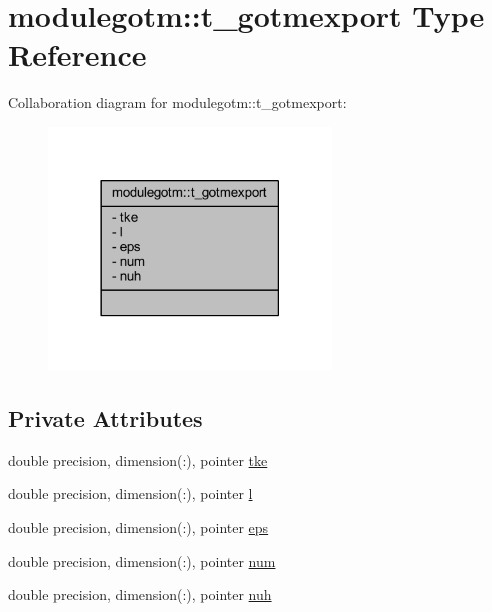 \hypertarget{structmodulegotm_1_1t__gotmexport}{}\section{modulegotm\+:\+:t\+\_\+gotmexport Type Reference}
\label{structmodulegotm_1_1t__gotmexport}


Collaboration diagram for modulegotm\+:\+:t\+\_\+gotmexport\+:\nopagebreak
\begin{figure}[H]
\begin{center}
\leavevmode
\includegraphics[width=213pt]{structmodulegotm_1_1t__gotmexport__coll__graph}
\end{center}
\end{figure}
\subsection*{Private Attributes}
\begin{DoxyCompactItemize}
\item 
double precision, dimension(\+:), pointer \mbox{\hyperlink{structmodulegotm_1_1t__gotmexport_ad511cb091890fff2ad674cf09fee3642}{tke}}
\item 
double precision, dimension(\+:), pointer \mbox{\hyperlink{structmodulegotm_1_1t__gotmexport_a6c418687085d20f38b7bc68916f49e14}{l}}
\item 
double precision, dimension(\+:), pointer \mbox{\hyperlink{structmodulegotm_1_1t__gotmexport_a2c456121976db8503a679667912b759e}{eps}}
\item 
double precision, dimension(\+:), pointer \mbox{\hyperlink{structmodulegotm_1_1t__gotmexport_a3c77e8630546f9b9a424d5dfb7284ffb}{num}}
\item 
double precision, dimension(\+:), pointer \mbox{\hyperlink{structmodulegotm_1_1t__gotmexport_a1c07a3eba20ae9bf04816d0cf3669e53}{nuh}}
\end{DoxyCompactItemize}



